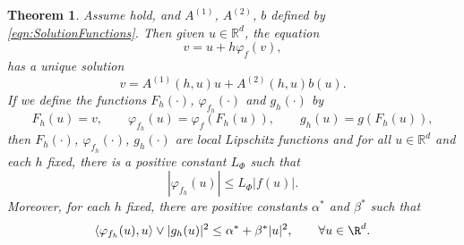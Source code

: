 \documentclass[sort&compress, preprint]{elsarticle}
\theoremstyle{definition}
\theoremstyle{plain}%
\newtheorem{thm}{Theorem}[section]
\theoremstyle{remark}
\newcommand{\innerprod}[2]{\left\langle#1, #2\right\rangle}
\begin{document}
\begin{thm}\label{lem:PhiFhProp}
	Assume  hold, and $A^{(1)}$, $A^{(2)}$, $b$  
	defined by 
	\eqref{eqn:SolutionFunctions}. Then given $u\in\mathbb{R}^d$, the equation
	\begin{equation}\label{eqn:varphiEquation}
		v = u + h \varphi_f(v),
	\end{equation}
	has a unique solution 
	\begin{equation}\label{eqn:varphiEqnSolution}
		v = A^{(1)}(h,u)u +A^{(2)}(h,u) b(u)	.
	\end{equation}
%
	If we define the functions
	$F_h(\cdot)$, $\varphi_{f_h}(\cdot)$ and $g_h(\cdot)$ by
	\begin{equation}\label{eqn:FunctionshDefinition}
		F_h(u) = v,
			\qquad 
			\varphi_{f_h}(u) =\varphi_{f}(F_h(u)),
			\qquad
			g_h(u) = g(F_h(u)),
	\end{equation}
	then $F_h(\cdot)$, $\varphi_{f_h}(\cdot)$, $g_h(\cdot)$ are local Lipschitz functions 
	and for all $u\in \mathbb{R}^d$ and each $h$ fixed, there is a positive constant $L_{\Phi}$ such that
	\begin{equation}\label{eqn:PhifhFbound}
		|\varphi_{f_h}(u)|\leq L_{\Phi} |f(u)|. 
	\end{equation} 
	Moreover, for each $h$ fixed,
	 there are positive constants $\alpha^*$ and  $\beta^*$ such that
	\begin{equation}\label{eqn:h-MonotoneCondition}
		\innerprod{\varphi_{f_h}(u)}{u} \vee |g_h(u)|^2 \leq \alpha^* + \beta^* |u|^2, 
		\qquad
		\forall u \in \R^d.
	\end{equation}
\end{thm}
%
\end{document}
